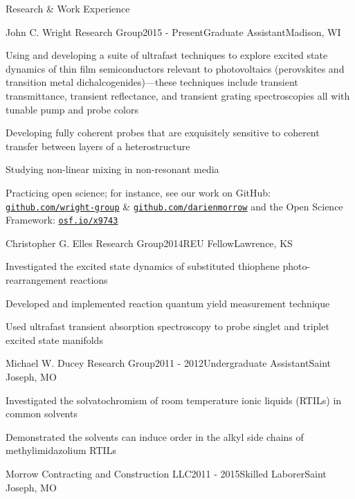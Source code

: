 \documentclass{resume} %
\begin{document}
\begin{rSection}{Research \& Work Experience}

\begin{rSubsection}{John C. Wright Research Group}{2015 - Present}{Graduate Assistant}{Madison, WI}
\item Using and developing a suite of ultrafast techniques to explore excited state dynamics of thin film semiconductors relevant to photovoltaics (perovskites and transition metal dichalcogenides)---these techniques include transient transmittance, transient reflectance, and transient grating spectroscopies all with tunable pump and probe colors
\item Developing fully coherent probes that are exquisitely sensitive to coherent transfer between layers of a heterostructure
\item Studying non-linear mixing in non-resonant media
\item Practicing open science; for instance, see our work on GitHub: \href{http://github.com/wright-group}{\texttt{github.com/wright-group}} \& \href{https://github.com/darienmorrow}{\texttt{github.com/darienmorrow}} and the Open Science Framework: \href{http://osf.io/x9743/}{\texttt{osf.io/x9743}}

\end{rSubsection}

\begin{rSubsection}{Christopher G. Elles Research Group}{2014}{REU Fellow}{Lawrence, KS}
	\item Investigated the excited state dynamics of substituted thiophene photo-rearrangement reactions
	\item Developed and implemented reaction quantum yield measurement technique
	\item Used ultrafast transient absorption spectroscopy to probe singlet and triplet excited state manifolds
\end{rSubsection}

\begin{rSubsection}{Michael W. Ducey Research Group}{2011 - 2012}{Undergraduate Assistant}{Saint Joseph, MO}
	\item Investigated the solvatochromism of room temperature ionic liquids (RTILs) in common solvents
	\item Demonstrated the solvents can induce order in the alkyl side chains of methylimidazolium RTILs
\end{rSubsection}

\begin{rSubsectionlistless}{Morrow Contracting and Construction LLC}{2011 - 2015}{Skilled Laborer}{Saint Joseph, MO}
\end{rSubsectionlistless}

\end{rSection}
\end{document}
